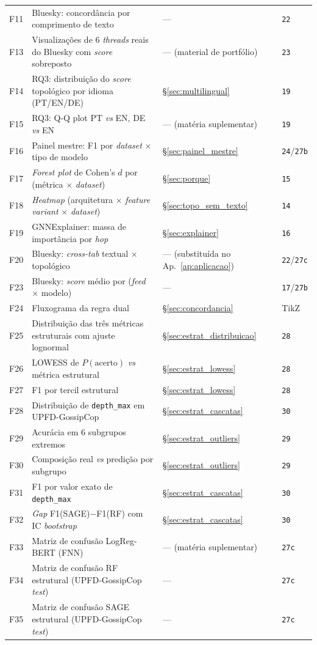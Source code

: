 \begin{longtable}{p{1cm}p{6.5cm}p{2.6cm}p{2.2cm}}
F11 & Bluesky: concord\^ancia por comprimento de texto & --- & \texttt{22} \\
F13 & Visualiza\c{c}\~oes de 6 \emph{threads} reais do Bluesky com \emph{score} sobreposto & --- (material de portf\'olio) & \texttt{23} \\
F14 & RQ3: distribui\c{c}\~ao do \emph{score} topol\'ogico por idioma (PT/EN/DE) & §\ref{sec:multilingual} & \texttt{19} \\
F15 & RQ3: Q-Q plot PT \emph{vs} EN, DE \emph{vs} EN & --- (mat\'eria suplementar) & \texttt{19} \\
F16 & Painel mestre: F1 por \emph{dataset} $\times$ tipo de modelo & §\ref{sec:painel_mestre} & \texttt{24}/\texttt{27b} \\
F17 & \emph{Forest plot} de Cohen's $d$ por (m\'etrica $\times$ \emph{dataset}) & §\ref{sec:porque} & \texttt{15} \\
F18 & \emph{Heatmap} (arquitetura $\times$ \emph{feature variant} $\times$ \emph{dataset}) & §\ref{sec:topo_sem_texto} & \texttt{14} \\
F19 & GNNExplainer: massa de import\^ancia por \emph{hop} & §\ref{sec:explainer} & \texttt{16} \\
F20 & Bluesky: \emph{cross-tab} textual $\times$ topol\'ogico & --- (substitu\'ida no Ap.~\ref{ap:aplicacao}) & \texttt{22}/\texttt{27c} \\
F23 & Bluesky: \emph{score} m\'edio por (\emph{feed} $\times$ modelo) & --- & \texttt{17}/\texttt{27b} \\
F24 & Fluxograma da regra dual & §\ref{sec:concordancia} & TikZ \\
F25 & Distribui\c{c}\~ao das tr\^es m\'etricas estruturais com ajuste lognormal & §\ref{sec:estrat_distribuicao} & \texttt{28} \\
F26 & LOWESS de $P(\text{acerto})$ \emph{vs} m\'etrica estrutural & §\ref{sec:estrat_lowess} & \texttt{28} \\
F27 & F1 por tercil estrutural & §\ref{sec:estrat_lowess} & \texttt{28} \\
F28 & Distribui\c{c}\~ao de \texttt{depth\_max} em UPFD-GossipCop & §\ref{sec:estrat_cascatas} & \texttt{30} \\
F29 & Acur\'acia em 6 subgrupos extremos & §\ref{sec:estrat_outliers} & \texttt{29} \\
F30 & Composi\c{c}\~ao real \emph{vs} predi\c{c}\~ao por subgrupo & §\ref{sec:estrat_outliers} & \texttt{29} \\
F31 & F1 por valor exato de \texttt{depth\_max} & §\ref{sec:estrat_cascatas} & \texttt{30} \\
F32 & \emph{Gap} F1(SAGE)$-$F1(RF) com IC \emph{bootstrap} & §\ref{sec:estrat_cascatas} & \texttt{30} \\
F33 & Matriz de confus\~ao LogReg-BERT (FNN) & --- (mat\'eria suplementar) & \texttt{27c} \\
F34 & Matriz de confus\~ao RF estrutural (UPFD-GossipCop \emph{test}) & --- & \texttt{27c} \\
F35 & Matriz de confus\~ao SAGE estrutural (UPFD-GossipCop \emph{test}) & --- & \texttt{27c} \\
\end{longtable}

